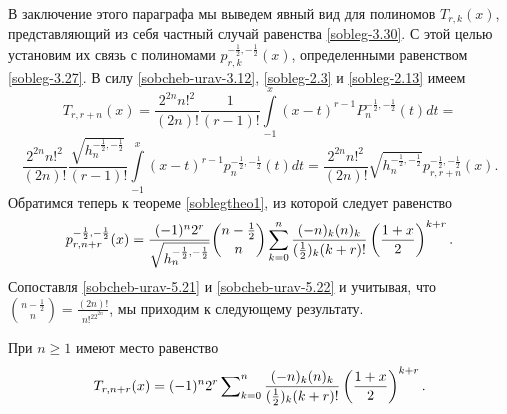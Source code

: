    В заключение этого параграфа мы выведем явный вид для полиномов  $T_{r,k}(x)$, представляющий из себя частный случай равенства \eqref{sobleg-3.30}. С этой целью установим их связь с полиномами $p_{r,k}^{-\frac12,-\frac12}(x)$, определенными равенством \eqref{sobleg-3.27}. В силу \eqref{sobcheb-urav-3.12},  \eqref{sobleg-2.3} и \eqref{sobleg-2.13} имеем
 $$
 T_{r,r+n}(x) =  \frac{2^{2n}{n!}^2}{(2n)!}\frac{1}{(r-1)!}\int\limits_{-1}^x(x-t)^{r-1}
   P_n^{-\frac{1}{2},-\frac{1}{2}}(t)dt=
$$
\begin{equation}\label{sobcheb-urav-5.21}
\frac{2^{2n}{n!}^2}{(2n)!}\frac{\sqrt{h_n^{-\frac{1}{2},-\frac{1}{2}}}}{(r-1)!}
\int\limits_{-1}^x(x-t)^{r-1}
   p_n^{-\frac{1}{2},-\frac{1}{2}}(t)dt= \frac{2^{2n}{n!}^2}{(2n)!}\sqrt{h_n^{-\frac{1}{2},-\frac{1}{2}}}
   p_{r,r+n}^{-\frac12,-\frac12}(x).
\end{equation}
Обратимся теперь к теореме \ref{soblegtheo1}, из которой следует равенство
\begin{equation}\label{sobcheb-urav-5.22}
p_{r,n+r}^{-\frac{1}{2},-\frac{1}{2}}(x)=\frac{(-1)^n2^{r}}{\sqrt{ h_n^{-\frac{1}{2},-\frac{1}{2}}}}
{n-\frac{1}{2}\choose n}
\sum_{k=0}^n{(-n)_k(n)_k\over (\frac12)_k(k+r)!}
\left({1+x\over 2}\right)^{k+r}.
\end{equation}
 Сопоставля \eqref{sobcheb-urav-5.21} и \eqref{sobcheb-urav-5.22} и учитывая, что ${n-\frac{1}{2}\choose n}=\frac{(2n)!}{n!^22^{2n}}$, мы приходим к следующему результату.
\begin{corollary} При $n\ge1$ имеют место равенство
\begin{equation}\label{sobcheb-urav-5.23}
T_{r,n+r}(x)=(-1)^n2^r\sum\nolimits_{k=0}^n{(-n)_k(n)_k\over (\frac12)_k(k+r)!}
\left({1+x\over 2}\right)^{k+r}.
\end{equation}
\end{corollary}


